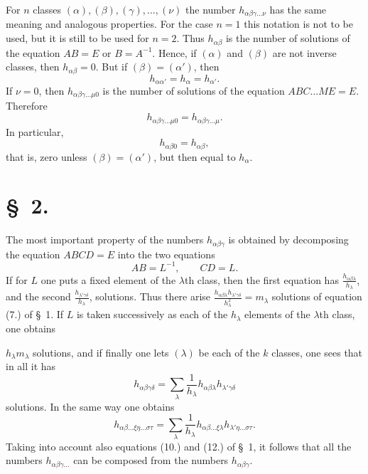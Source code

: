 \documentclass[11pt]{article}
\begin{document}
For $n$ classes $(\alpha),(\beta),(\gamma),\ldots,(\nu)$ the number $h_{\alpha\beta\gamma\ldots\nu}$ has the same meaning and analogous properties. For the case $n=1$ this notation is not to be used, but it is still to be used for $n=2$. Thus $h_{\alpha\beta}$ is the number of solutions of the equation $AB=E$ or $B=A^{-1}$. Hence, if $(\alpha)$ and $(\beta)$ are not inverse classes, then $h_{\alpha\beta}=0$. But if $(\beta)=(\alpha')$, then
\begin{equation*}\tag{10.}
h_{\alpha\alpha'}=h_\alpha=h_{\alpha'}.
\end{equation*}
If $\nu=0$, then $h_{\alpha\beta\gamma\ldots\mu0}$ is the number of solutions of the equation $ABC\ldots ME=E$. Therefore
\begin{equation*}\tag{11.}
h_{\alpha\beta\gamma\ldots\mu0}=h_{\alpha\beta\gamma\ldots\mu}.
\end{equation*}
In particular,
\begin{equation*}\tag{12.}
h_{\alpha\beta0}=h_{\alpha\beta},
\end{equation*}
that is, zero unless $(\beta)=(\alpha')$, but then equal to $h_\alpha$.

\section*{\S~2.}

The most important property of the numbers $h_{\alpha\beta\gamma}$ is obtained by decomposing the equation $ABCD=E$ into the two equations
\[
AB=L^{-1},\qquad CD=L.
\]
If for $L$ one puts a fixed element of the $\lambda$th class, then the first equation has $\frac{h_{\alpha\beta\lambda}}{h_\lambda}$, and the second $\frac{h_{\lambda'\gamma\delta}}{h_\lambda}$, solutions. Thus there arise $\frac{h_{\alpha\beta\lambda}h_{\lambda'\gamma\delta}}{h_\lambda^2}=m_\lambda$ solutions of equation (7.) of \S~1. If $L$ is taken successively as each of the $h_\lambda$ elements of the $\lambda$th class, one obtains




$h_\lambda m_\lambda$ solutions, and if finally one lets $(\lambda)$ be each of the $k$ classes, one sees that in all it has
\begin{equation*}\tag{1.}
h_{\alpha\beta\gamma\delta}=\sum_\lambda \frac{1}{h_\lambda}h_{\alpha\beta\lambda}h_{\lambda'\gamma\delta}
\end{equation*}
solutions. In the same way one obtains
\begin{equation*}\tag{2.}
h_{\alpha\beta\ldots\xi\eta\ldots\sigma\tau}=\sum_\lambda \frac{1}{h_\lambda}h_{\alpha\beta\ldots\xi\lambda}h_{\lambda'\eta\ldots\sigma\tau}.
\end{equation*}
Taking into account also equations (10.) and (12.) of \S~1, it follows that all the numbers $h_{\alpha\beta\gamma\ldots}$ can be composed from the numbers $h_{\alpha\beta\gamma}$.
\end{document}
